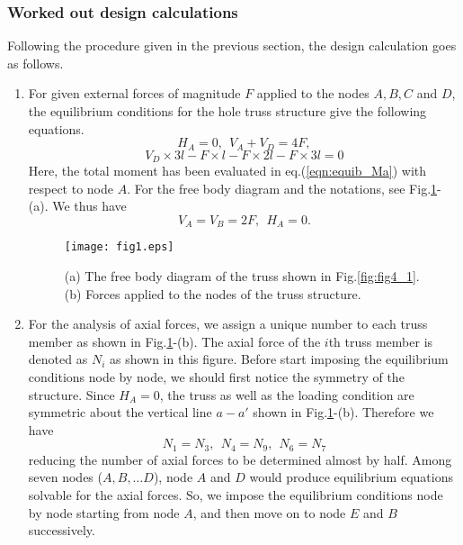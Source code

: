 \documentclass[10pt,a4j]{article}
\begin{document}
\subsubsection{Worked out design calculations}
Following the procedure given in the previous section, the design calculation goes as follows.  
\begin{enumerate}
\item
	For given external forces of magnitude $F$ applied to the nodes $A,B,C$ and $D$, 
	the equilibrium conditions for the hole truss structure give the following equations. 
	\begin{equation}
		H_A=0, \ \ V_A+V_D=4F, 
		\label{eqn:equib_fs}
	\end{equation}
	\begin{equation}
		V_D\times 3l - F\times l-F\times 2l-F\times 3l=0
		\label{eqn:equib_Ma}
	\end{equation}
	Here, the total moment has been evaluated in eq.(\ref{eqn:equib_Ma}) with respect to node $A$.
		For the free body diagram and the notations, see Fig.\ref{fig:fig1}-(a).
	We thus have 
	\begin{equation}
		V_A=V_B=2F, \ \ H_A=0.
		\label{eqn:reac_fs}
	\end{equation}
\begin{figure}[h]
	\begin{center}
	\texttt{[image: fig1.eps]} 
	\end{center}
	\caption{(a) The free body diagram of the truss shown in Fig.\ref{fig:fig4_1}. 
	(b) Forces applied to the nodes of the truss structure.} 
	\label{fig:fig1}
\end{figure}
\item
	For the analysis of axial forces, we assign a unique number to 
	each truss member as shown in Fig.\ref{fig:fig1}-(b).
	The axial force of the $i$th truss member is denoted as $N_i$ as shown in this figure.
	Before start imposing the equilibrium conditions node by node, we should 
	first notice the symmetry of the structure. 
	Since $H_A=0$, the truss as well as the loading condition are symmetric about the vertical 
	line $a-a'$ shown in Fig.\ref{fig:fig1}-(b). 
	Therefore we have 	
	\[
		N_1=N_3, \ \ N_4=N_9,\ \  N_6=N_7
	\]
	reducing the number of axial forces to be determined almost by half.
	Among seven nodes ($A,B,\dots D$), node $A$ and $D$ would produce 
	equilibrium equations solvable for the axial forces. So, we impose the 
	equilibrium conditions node by node starting from node $A$, 
	and then move on to node $E$ and $B$ successively. 

\end{enumerate}
\end{document}

